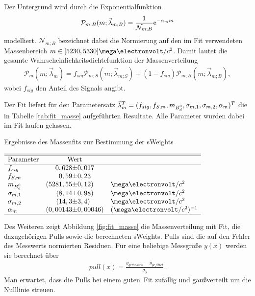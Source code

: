 Der Untergrund wird durch die Exponentialfunktion
\begin{align}
\mathcal{P}_{m;B}(m;\vec{\lambda}_{m;B}) = \frac{1}{\mathcal{N}_{m;B}}\mathrm{e}^{-\alpha_m m}
\end{align}
modelliert. $\mathcal{N}_{m;B}$ bezeichnet dabei die Normierung auf den im Fit verwendeten Massenbereich $m \in [5230,5330]\mega\electronvolt/c^2$. Damit lautet die gesamte Wahrscheinlichkeitsdichtefunktion der Massenverteilung
\begin{align}
\mathcal{P}_{m}(m;\vec{\lambda}_{m}) = f_{sig}\mathcal{P}_{m;S}(m;\vec{\lambda}_{m;S}) + (1-f_{sig})\mathcal{P}_{m;B}(m;\vec{\lambda}_{m;B}) \label{eq:pdf_masse},
\end{align}
wobei $f_{sig}$ den Anteil des Signals angibt.

Der Fit liefert für den Parametersatz $\vec{\lambda}_{m}^T = (f_{sig}, f_{S,m}, m_{\text{$B_d^0$}}, \sigma_{m,1},\sigma_{m,2}, \alpha_m)^T$ die in Tabelle \ref{tab:fit_masse} aufgeführten Resultate. Alle Parameter wurden dabei im Fit laufen gelassen. 

\begin{table}[hptb]
\centering
\caption{Ergebnisse des Massenfits zur Bestimmung der sWeights}
\label{tab:fit_masse}
$\begin{array}{lr@{\pm}ll}
\hline \hline
\text{Parameter} & \multicolumn{2}{c}{\text{Wert}} & \\ \hline
f_{sig}   & 0,628 & 0,017 &\\
f_{S,m}   & 0,59 & 0,23 &\\
m_{\text{\Bd}} & (5281,55 & 0,12)& \mega\electronvolt/c^2 \\
\sigma_{m,1} & (8,14 & 0,98)& \mega\electronvolt/c^2 \\
\sigma_{m,2} & (14,3 & 3,4) &\mega\electronvolt/c^2 \\
\alpha_m & (0,00143 & 0,00046) &(\mega\electronvolt/c^2)^{-1} \\ \hline
\end{array}$
\end{table}

Des Weiteren zeigt Abbildung \ref{fig:fit_masse} die Massenverteilung mit Fit, die dazugehörigen Pulls sowie die berechneten sWeights. Pulls sind die auf den Fehler des Messwerts normierten Residuen. Für eine beliebige Messgröße $y(x)$ werden sie berechnet über
\begin{align}
pull(x) = \frac{y_{gemessen}-y_{gefittet}}{\sigma_y}.
\end{align}
Man erwartet, dass die Pulls bei einem \glqq guten\grqq\ Fit zufällig und gaußverteilt um die Nulllinie streuen.

